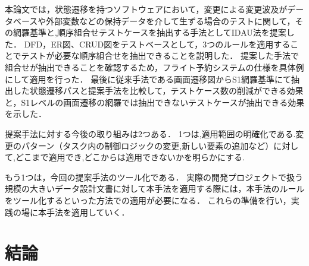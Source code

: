 \documentclass[a4paper,12pt]{jreport}
\begin{document}
本論文では，状態遷移を持つソフトウェアにおいて，変更による変更波及がデータベースや外部変数などの保持データを介して生ずる場合のテストに関して，その網羅基準と,順序組合せテストケースを抽出する手法としてIDAU法を提案した．
DFD，ER図、CRUD図をテストベースとして，3つのルールを適用することでテストが必要な順序組合せを抽出できることを説明した．
提案した手法で組合せが抽出できることを確認するため，フライト予約システムの仕様を具体例にして適用を行った．
最後に従来手法である画面遷移図からS1網羅基準にて抽出した状態遷移パスと提案手法を比較して，テストケース数の削減ができる効果と，S1レベルの画面遷移の網羅では抽出できないテストケースが抽出できる効果を示した．

提案手法に対する今後の取り組みは2つある．
1つは,適用範囲の明確化である.変更のパターン（タスク内の制御ロジックの変更,新しい要素の追加など）に対して,どこまで適用でき,どこからは適用できないかを明らかにする.

もう1つは，今回の提案手法のツール化である．
実際の開発プロジェクトで扱う規模の大きいデータ設計文書に対して本手法を適用する際には，本手法のルールをツール化するといった方法での適用が必要になる．
これらの準備を行い，実践の場に本手法を適用していく．

\chapter{結論}




\newpage

\renewcommand{\bibname}{参考文献}

 

\end{document}
